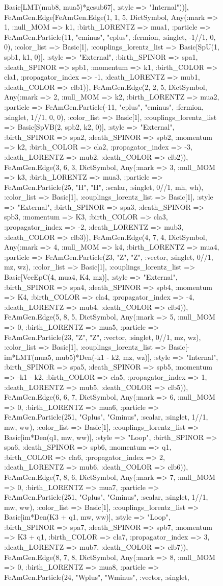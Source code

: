 \documentclass{revtex4}
\begin{document}
\begin{figure}[!htb]
\begin{center}
{Basic[LMT(mub8, mua5)*gcsub67], :style => "Internal"))], FeAmGen.Edge[FeAmGen.Edge(1, 1, 5, Dict{Symbol, Any}(:mark => 1, :null_MOM => k1, :birth_LORENTZ => mua1, :particle => FeAmGen.Particle(11, "eminus", "eplus", :fermion, :singlet, -1//1, 0, 0), :color_list => Basic[1], :couplings_lorentz_list => Basic[SpU(1, spb1, k1, 0)], :style => "External", :birth_SPINOR => spa1, :death_SPINOR => spb1, :momentum => k1, :birth_COLOR => cla1, :propagator_index => -1, :death_LORENTZ => mub1, :death_COLOR => clb1)), FeAmGen.Edge(2, 2, 5, Dict{Symbol, Any}(:mark => 2, :null_MOM => k2, :birth_LORENTZ => mua2, :particle => FeAmGen.Particle(-11, "eplus", "eminus", :fermion, :singlet, 1//1, 0, 0), :color_list => Basic[1], :couplings_lorentz_list => Basic[SpVB(2, spb2, k2, 0)], :style => "External", :birth_SPINOR => spa2, :death_SPINOR => spb2, :momentum => k2, :birth_COLOR => cla2, :propagator_index => -3, :death_LORENTZ => mub2, :death_COLOR => clb2)), FeAmGen.Edge(3, 6, 3, Dict{Symbol, Any}(:mark => 3, :null_MOM => k3, :birth_LORENTZ => mua3, :particle => FeAmGen.Particle(25, "H", "H", :scalar, :singlet, 0//1, mh, wh), :color_list => Basic[1], :couplings_lorentz_list => Basic[1], :style => "External", :birth_SPINOR => spa3, :death_SPINOR => spb3, :momentum => K3, :birth_COLOR => cla3, :propagator_index => -2, :death_LORENTZ => mub3, :death_COLOR => clb3)), FeAmGen.Edge(4, 7, 4, Dict{Symbol, Any}(:mark => 4, :null_MOM => k4, :birth_LORENTZ => mua4, :particle => FeAmGen.Particle(23, "Z", "Z", :vector, :singlet, 0//1, mz, wz), :color_list => Basic[1], :couplings_lorentz_list => Basic[VecEpC(4, mua4, K4, mz)], :style => "External", :birth_SPINOR => spa4, :death_SPINOR => spb4, :momentum => K4, :birth_COLOR => cla4, :propagator_index => -4, :death_LORENTZ => mub4, :death_COLOR => clb4)), FeAmGen.Edge(5, 8, 5, Dict{Symbol, Any}(:mark => 5, :null_MOM => 0, :birth_LORENTZ => mua5, :particle => FeAmGen.Particle(23, "Z", "Z", :vector, :singlet, 0//1, mz, wz), :color_list => Basic[1], :couplings_lorentz_list => Basic[-im*LMT(mua5, mub5)*Den(-k1 - k2, mz, wz)], :style => "Internal", :birth_SPINOR => spa5, :death_SPINOR => spb5, :momentum => -k1 - k2, :birth_COLOR => cla5, :propagator_index => 1, :death_LORENTZ => mub5, :death_COLOR => clb5)), FeAmGen.Edge(6, 6, 7, Dict{Symbol, Any}(:mark => 6, :null_MOM => 0, :birth_LORENTZ => mua6, :particle => FeAmGen.Particle(251, "Gplus", "Gminus", :scalar, :singlet, 1//1, mw, ww), :color_list => Basic[1], :couplings_lorentz_list => Basic[im*Den(q1, mw, ww)], :style => "Loop", :birth_SPINOR => spa6, :death_SPINOR => spb6, :momentum => q1, :birth_COLOR => cla6, :propagator_index => 2, :death_LORENTZ => mub6, :death_COLOR => clb6)), FeAmGen.Edge(7, 8, 6, Dict{Symbol, Any}(:mark => 7, :null_MOM => 0, :birth_LORENTZ => mua7, :particle => FeAmGen.Particle(251, "Gplus", "Gminus", :scalar, :singlet, 1//1, mw, ww), :color_list => Basic[1], :couplings_lorentz_list => Basic[im*Den(K3 + q1, mw, ww)], :style => "Loop", :birth_SPINOR => spa7, :death_SPINOR => spb7, :momentum => K3 + q1, :birth_COLOR => cla7, :propagator_index => 3, :death_LORENTZ => mub7, :death_COLOR => clb7)), FeAmGen.Edge(8, 7, 8, Dict{Symbol, Any}(:mark => 8, :null_MOM => 0, :birth_LORENTZ => mua8, :particle => FeAmGen.Particle(24, "Wplus", "Wminus", :vector, :singlet, }
\end{center}
\end{figure}
\end{document}
